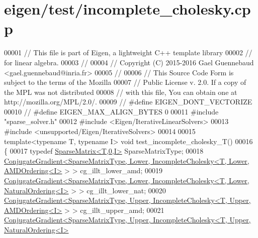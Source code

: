 \hypertarget{eigen_2test_2incomplete__cholesky_8cpp_source}{}\section{eigen/test/incomplete\+\_\+cholesky.cpp}
\label{eigen_2test_2incomplete__cholesky_8cpp_source}

\begin{DoxyCode}
00001 \textcolor{comment}{// This file is part of Eigen, a lightweight C++ template library}
00002 \textcolor{comment}{// for linear algebra.}
00003 \textcolor{comment}{//}
00004 \textcolor{comment}{// Copyright (C) 2015-2016 Gael Guennebaud <gael.guennebaud@inria.fr>}
00005 \textcolor{comment}{//}
00006 \textcolor{comment}{// This Source Code Form is subject to the terms of the Mozilla}
00007 \textcolor{comment}{// Public License v. 2.0. If a copy of the MPL was not distributed}
00008 \textcolor{comment}{// with this file, You can obtain one at http://mozilla.org/MPL/2.0/.}
00009 \textcolor{comment}{// #define EIGEN\_DONT\_VECTORIZE}
00010 \textcolor{comment}{// #define EIGEN\_MAX\_ALIGN\_BYTES 0}
00011 \textcolor{preprocessor}{#include "sparse\_solver.h"}
00012 \textcolor{preprocessor}{#include <Eigen/IterativeLinearSolvers>}
00013 \textcolor{preprocessor}{#include <unsupported/Eigen/IterativeSolvers>}
00014 
00015 \textcolor{keyword}{template}<\textcolor{keyword}{typename} T, \textcolor{keyword}{typename} I> \textcolor{keywordtype}{void} test\_incomplete\_cholesky\_T()
00016 \{
00017   \textcolor{keyword}{typedef} \hyperlink{group___sparse_core___module_class_eigen_1_1_sparse_matrix}{SparseMatrix<T,0,I>} SparseMatrixType;
00018   
      \hyperlink{group___iterative_linear_solvers___module_class_eigen_1_1_conjugate_gradient}{ConjugateGradient<SparseMatrixType, Lower, IncompleteCholesky<T, Lower, AMDOrdering<I>}
       > >        cg\_illt\_lower\_amd;
00019   
      \hyperlink{group___iterative_linear_solvers___module_class_eigen_1_1_conjugate_gradient}{ConjugateGradient<SparseMatrixType, Lower, IncompleteCholesky<T, Lower, NaturalOrdering<I>}
       > >    cg\_illt\_lower\_nat;
00020   
      \hyperlink{group___iterative_linear_solvers___module_class_eigen_1_1_conjugate_gradient}{ConjugateGradient<SparseMatrixType, Upper, IncompleteCholesky<T, Upper, AMDOrdering<I>}
       > >        cg\_illt\_upper\_amd;
00021   
      \hyperlink{group___iterative_linear_solvers___module_class_eigen_1_1_conjugate_gradient}{ConjugateGradient<SparseMatrixType, Upper, IncompleteCholesky<T, Upper, NaturalOrdering<I>}

\end{DoxyCode}
